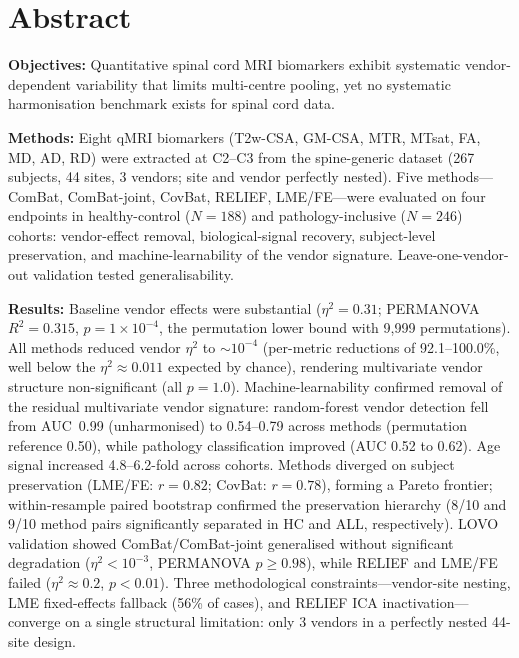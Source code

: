 \documentclass[12pt,a4paper]{article}
\begin{document}
\linenumbers

\section*{Abstract}

\noindent\textbf{Objectives:} Quantitative spinal cord MRI biomarkers exhibit systematic vendor-dependent variability that limits multi-centre pooling, yet no systematic harmonisation benchmark exists for spinal cord data.

\noindent\textbf{Methods:} Eight qMRI biomarkers (T2w-CSA, GM-CSA, MTR, MTsat, FA, MD, AD, RD) were extracted at C2--C3 from the spine-generic dataset (267 subjects, 44 sites, 3 vendors; site and vendor perfectly nested). Five methods---ComBat, ComBat-joint, CovBat, RELIEF, LME/FE---were evaluated on four endpoints in healthy-control ($N=188$) and pathology-inclusive ($N=246$) cohorts: vendor-effect removal, biological-signal recovery, subject-level preservation, and machine-learnability of the vendor signature. Leave-one-vendor-out validation tested generalisability.

\noindent\textbf{Results:} Baseline vendor effects were substantial ($\eta^2=0.31$; PERMANOVA $R^2=0.315$, $p=1\times10^{-4}$, the permutation lower bound with 9,999 permutations). All methods reduced vendor $\eta^2$ to ${\sim}10^{-4}$ (per-metric reductions of 92.1--100.0\%, well below the $\eta^2\approx0.011$ expected by chance), rendering multivariate vendor structure non-significant (all $p=1.0$). Machine-learnability confirmed removal of the residual multivariate vendor signature: random-forest vendor detection fell from AUC~0.99 (unharmonised) to 0.54--0.79 across methods (permutation reference 0.50), while pathology classification improved (AUC 0.52 to 0.62). Age signal increased 4.8--6.2-fold across cohorts. Methods diverged on subject preservation (LME/FE: $r=0.82$; CovBat: $r=0.78$), forming a Pareto frontier; within-resample paired bootstrap confirmed the preservation hierarchy (8/10 and 9/10 method pairs significantly separated in HC and ALL, respectively). LOVO validation showed ComBat/ComBat-joint generalised without significant degradation ($\eta^2<10^{-3}$, PERMANOVA $p\geq0.98$), while RELIEF and LME/FE failed ($\eta^2\approx0.2$, $p<0.01$). Three methodological constraints---vendor-site nesting, LME fixed-effects fallback (56\% of cases), and RELIEF ICA inactivation---converge on a single structural limitation: only 3 vendors in a perfectly nested 44-site design.
\end{document}
